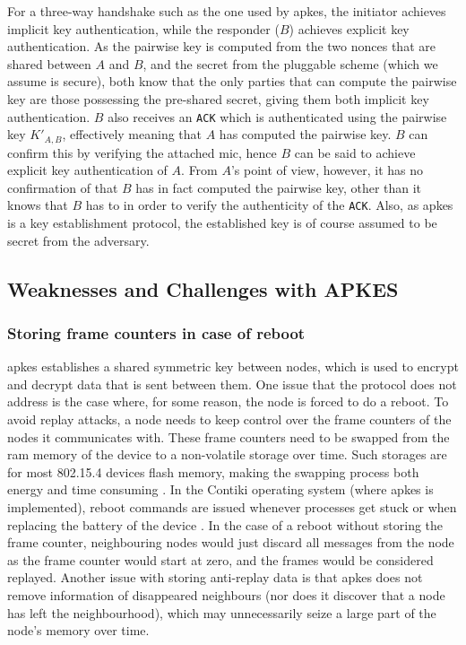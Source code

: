 For a three-way handshake such as the one used by \gls{apkes}, the initiator achieves implicit key authentication, while the responder ($B$) achieves explicit key authentication. As the pairwise key is computed from the two nonces that are shared between $A$ and $B$, and the secret from the pluggable scheme (which we assume is secure), both know that the only parties that can compute the pairwise key are those possessing the pre-shared secret, giving them both implicit key authentication. $B$ also receives an \texttt{ACK} which is authenticated using the pairwise key $K'_{A,B}$, effectively meaning that $A$ has computed the pairwise key. $B$ can confirm this by verifying the attached \gls{mic}, hence $B$ can be said to achieve explicit key authentication of $A$. From $A$'s point of view, however, it has no confirmation of that $B$ has in fact computed the pairwise key, other than it knows that $B$ has to in order to verify the authenticity of the \texttt{ACK}. Also, as \gls{apkes} is a key establishment protocol, the established key is of course assumed to be secret from the adversary.

\subsection{Weaknesses and Challenges with APKES}
\label{subsec:apkes-weakness}

\subsubsection{Storing frame counters in case of reboot}

\gls{apkes} establishes a shared symmetric key between nodes, which is used to encrypt and decrypt data that is sent between them. One issue that the protocol does not address is the case where, for some reason, the node is forced to do a reboot. To avoid replay attacks, a node needs to keep control over the frame counters of the nodes it communicates with. These frame counters need to be swapped from the \gls{ram} memory of the device to a non-volatile storage over time. Such storages are for most 802.15.4 devices flash memory, making the swapping process both energy and time consuming \cite{krentz2015handling}. In the Contiki operating system (where \gls{apkes} is implemented), reboot commands are issued whenever processes get stuck or when replacing the battery of the device \cite{dunkels2004contiki}. In the case of a reboot without storing the frame counter, neighbouring nodes would just discard all messages from the node as the frame counter would start at zero, and the frames would be considered replayed. Another issue with storing anti-replay data is that \gls{apkes} does not remove information of disappeared neighbours (nor does it discover that a node has left the neighbourhood), which may unnecessarily seize a large part of the node's memory over time.  

